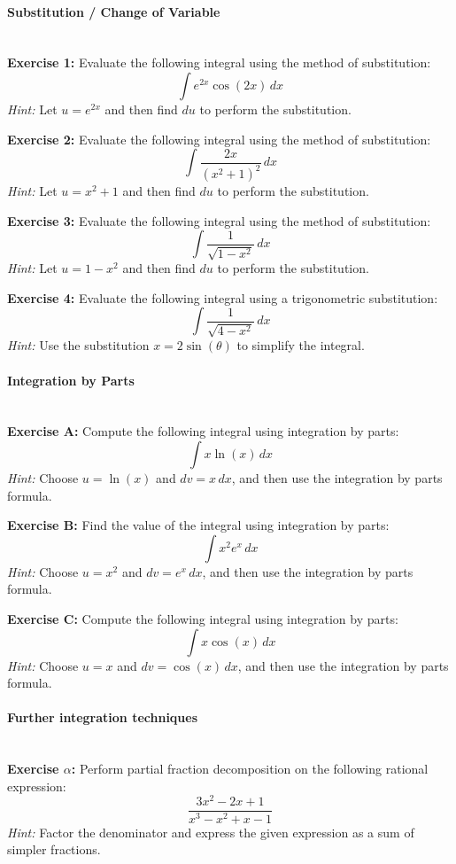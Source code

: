 \documentclass[]{article}
\begin{document}
	\paragraph{Substitution / Change of Variable}\mbox{}\\
	\textbf{Exercise 1:}
	Evaluate the following integral using the method of substitution:
	\[
	\int e^{2x} \cos(2x) \, dx
	\]
	\textit{Hint:} Let \( u = e^{2x} \) and then find \( du \) to perform the substitution.
	
	\textbf{Exercise 2:}
	Evaluate the following integral using the method of substitution:
	\[
	\int \frac{2x}{(x^2 + 1)^2} \, dx
	\]
	\textit{Hint:} Let \( u = x^2 + 1 \) and then find \( du \) to perform the substitution.
	
	\textbf{Exercise 3:}
	Evaluate the following integral using the method of substitution:
	\[
	\int \frac{1}{\sqrt{1 - x^2}} \, dx
	\]
	\textit{Hint:} Let \( u = 1 - x^2 \) and then find \( du \) to perform the substitution.
	
	\textbf{Exercise 4:}
	Evaluate the following integral using a trigonometric substitution:
	\[
	\int \frac{1}{\sqrt{4 - x^2}} \, dx
	\]
	\textit{Hint:} Use the substitution \(x = 2\sin(\theta)\) to simplify the integral.
	
	
	\paragraph{Integration by Parts}\mbox{}\\
	\textbf{Exercise A:}
	Compute the following integral using integration by parts:
	\[
	\int x \ln(x) \, dx
	\]
	\textit{Hint:} Choose \( u = \ln(x) \) and \( dv = x \, dx \), and then use the integration by parts formula.
	
	\textbf{Exercise B:}
	Find the value of the integral using integration by parts:
	\[
	\int x^2 e^x \, dx
	\]
	\textit{Hint:} Choose \( u = x^2 \) and \( dv = e^x \, dx \), and then use the integration by parts formula.
	
	\textbf{Exercise C:}
	Compute the following integral using integration by parts:
	\[
	\int x \cos(x) \, dx
	\]
	\textit{Hint:} Choose \( u = x \) and \( dv = \cos(x) \, dx \), and then use the integration by parts formula.
	
	\paragraph{Further integration techniques}\mbox{}\\
	\textbf{Exercise $\alpha$:}
	Perform partial fraction decomposition on the following rational expression:
	\[
	\frac{3x^2 - 2x + 1}{x^3 - x^2 + x - 1}
	\]
	\textit{Hint:} Factor the denominator and express the given expression as a sum of simpler fractions.
	
\end{document}
